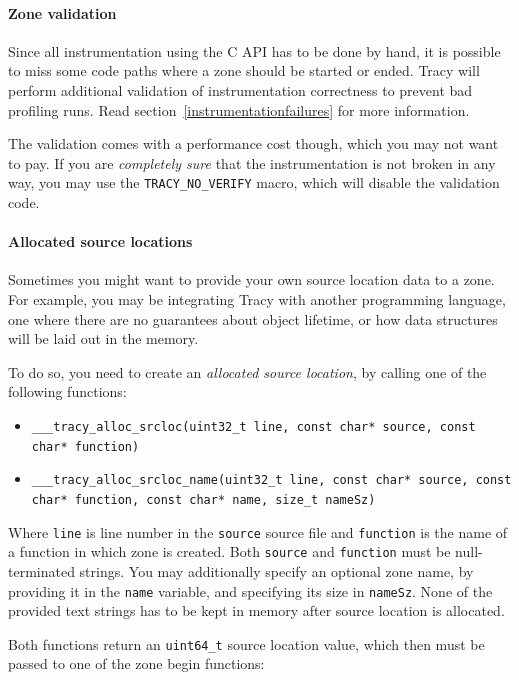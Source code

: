 \documentclass[hidelinks,titlepage,a4paper]{article}
\begin{document}
\paragraph{Zone validation}

Since all instrumentation using the C API has to be done by hand, it is possible to miss some code paths where a zone should be started or ended. Tracy will perform additional validation of instrumentation correctness to prevent bad profiling runs. Read section~\ref{instrumentationfailures} for more information.

The validation comes with a performance cost though, which you may not want to pay. If you are \emph{completely sure} that the instrumentation is not broken in any way, you may use the \texttt{TRACY\_NO\_VERIFY} macro, which will disable the validation code.

\paragraph{Allocated source locations}

Sometimes you might want to provide your own source location data to a zone. For example, you may be integrating Tracy with another programming language, one where there are no guarantees about object lifetime, or how data structures will be laid out in the memory.

To do so, you need to create an \emph{allocated source location}, by calling one of the following functions:

\begin{itemize}
\item \texttt{\_\_\_tracy\_alloc\_srcloc(uint32\_t line, const char* source, const char* function)}
\item \texttt{\_\_\_tracy\_alloc\_srcloc\_name(uint32\_t line, const char* source, const char* function, const char* name, size\_t nameSz)}
\end{itemize}

Where \texttt{line} is line number in the \texttt{source} source file and \texttt{function} is the name of a function in which zone is created. Both \texttt{source} and \texttt{function} must be null-terminated strings. You may additionally specify an optional zone name, by providing it in the \texttt{name} variable, and specifying its size in \texttt{nameSz}. None of the provided text strings has to be kept in memory after source location is allocated.

Both functions return an \texttt{uint64\_t} source location value, which then must be passed to one of the zone begin functions:
\end{document}
